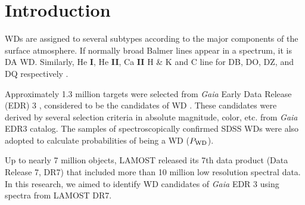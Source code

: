 \documentclass{aastex631}
\begin{document}

\section{Introduction} \label{sec:intro}

WDs are assigned to several subtypes according to the major components of the surface atmosphere.
If normally broad Balmer lines appear in a spectrum, it is DA WD.
Similarly, He {\small \bf I}, He {\small \bf II}, Ca {\small \bf II} H \& K and C line for DB, DO, DZ, and DQ respectively \citep{2013ApJS..204....5K}. 

Approximately 1.3 million targets were selected from {\it Gaia} Early Data Release (EDR) 3 \citep{2021A&A...649A...1G}, considered to be the candidates of WD \citep{2021arXiv210607669G}.
These candidates were derived by several selection criteria in absolute magnitude, color, etc. from {\it Gaia} EDR3 catalog.
The samples of spectroscopically confirmed SDSS WDs were also adopted to calculate probabilities of being a WD ($P_{\rm WD}$).

Up to nearly 7 million objects, LAMOST \citep{2015RAA....15.1095L} released its 7th data product (Data Release 7, DR7) that included more than 10 million low resolution spectral data.
In this research, we aimed to identify WD candidates of {\it Gaia} EDR 3 using spectra from LAMOST DR7.
\end{document}

